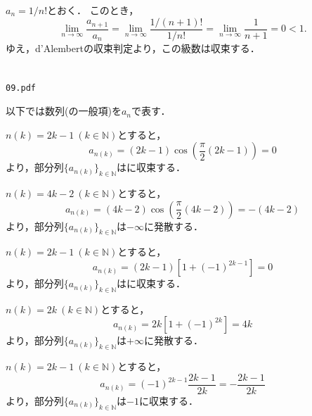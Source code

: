 \documentclass[uplatex,11pt]{jsarticle}
\def\shoumon#1{\vspace{1em}\noindent\ovalbox{\textsf{ #1 }}}
\begin{document}
$a_n = 1/n!$とおく．
このとき，
\begin{equation*}
	\lim_{n\rightarrow\infty} \frac{a_{n+1}}{a_n}
	=
	\lim_{n\rightarrow\infty} \frac{1/(n+1)!}{1/n!}
	=
	\lim_{n\rightarrow\infty} \frac{1}{n+1}
	= 0 <1.
\end{equation*}
ゆえ，\textsf{d'Alembertの収束判定}より，この級数は収束する．

\newpage
\section{}

\begin{shadebox}
	\begin{center}
		\texttt{09.pdf}
	\end{center}
\end{shadebox}
\vspace{5mm}

以下では数列(の一般項)を$a_n$で表す．

\shoumon{(1)}

$n(k)=2k-1 \ (k\in\mathbb{N})$とすると，
\begin{equation*}
	a_{n(k)}
	=
	(2k-1)\cos\left(\frac{\pi}{2}(2k-1)\right)
	=0
\end{equation*}
より，部分列$\{a_{n(k)}\}_{k\in\mathbb{N}}$はに収束する．

$n(k)=4k-2 \ (k\in\mathbb{N})$とすると，
\begin{equation*}
	a_{n(k)}
	=
	(4k-2)\cos\left(\frac{\pi}{2}(4k-2)\right)
	=-(4k-2)
\end{equation*}
より，部分列$\{a_{n(k)}\}_{k\in\mathbb{N}}$は$-\infty$に発散する．


\shoumon{(2)}

$n(k)=2k-1 \ (k\in\mathbb{N})$とすると，
\begin{equation*}
	a_{n(k)}
	=
	(2k-1)[1+(-1)^{2k-1}]
	=0
\end{equation*}
より，部分列$\{a_{n(k)}\}_{k\in\mathbb{N}}$はに収束する．

$n(k)=2k \ (k\in\mathbb{N})$とすると，
\begin{equation*}
	a_{n(k)}
	=
	2k[1+(-1)^{2k}]
	=4k
\end{equation*}
より，部分列$\{a_{n(k)}\}_{k\in\mathbb{N}}$は$+\infty$に発散する．


\shoumon{(3)}

$n(k)=2k-1 \ (k\in\mathbb{N})$とすると，
\begin{equation*}
	a_{n(k)}
	=
	(-1)^{2k-1}\frac{2k-1}{2k}
	=
	-\frac{2k-1}{2k}
\end{equation*}
より，部分列$\{a_{n(k)}\}_{k\in\mathbb{N}}$は$-1$に収束する．
\end{document}
